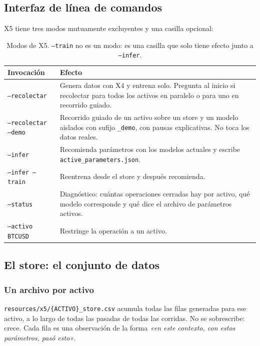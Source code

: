 \documentclass[11pt,a4paper]{article}
\newcommand{\code}[1]{\texttt{\small #1}}
\begin{document}
\subsection{Interfaz de línea de comandos}

X5 tiene tres modos mutuamente excluyentes y una casilla opcional:

\begin{table}[h]
\centering
\small
\begin{tabularx}{\linewidth}{@{}l X@{}}
\toprule
\textbf{Invocación} & \textbf{Efecto} \\
\midrule
\code{--recolectar} & Genera datos con X4 y entrena solo. Pregunta al inicio si recolectar para todos los activos en paralelo o para uno en recorrido guiado. \\
\code{--recolectar --demo} & Recorrido guiado de un activo sobre un store y un modelo aislados con sufijo \code{_demo}, con pausas explicativas. No toca los datos reales. \\
\code{--infer} & Recomienda parámetros con los modelos actuales y escribe \code{active_parameters.json}. \\
\code{--infer --train} & Reentrena desde el store y después recomienda. \\
\code{--status} & Diagnóstico: cuántas operaciones cerradas hay por activo, qué modelo corresponde y qué dice el archivo de parámetros activos. \\
\code{--activo BTCUSD} & Restringe la operación a un activo. \\
\bottomrule
\end{tabularx}
\caption{Modos de X5. \code{--train} no es un modo: es una casilla que solo tiene efecto junto a \code{--infer}.}
\end{table}

\subsection{El store: el conjunto de datos}

\subsubsection{Un archivo por activo}

\code{resources/x5/\{ACTIVO\}_store.csv} acumula todas las filas generadas para ese activo, a
lo largo de todas las pasadas de todas las corridas. No se sobrescribe: crece. Cada fila es
una observación de la forma \textit{«en este contexto, con estos parámetros, pasó esto»}.
\end{document}
